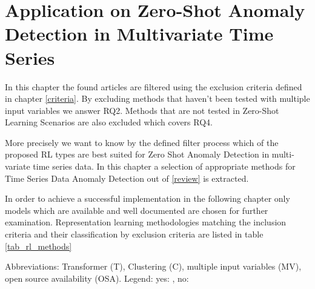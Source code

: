 \section{Application on Zero-Shot Anomaly Detection in Multivariate Time Series}\label{application}
In this chapter the found articles are filtered using the exclusion criteria defined in chapter \ref{criteria}. By excluding methods that haven't been tested with multiple input variables we answer RQ2. Methods that are not tested in Zero-Shot Learning Scenarios are also excluded which covers RQ4.

More precisely we want to know by the defined filter process which of the proposed RL types are best suited for Zero Shot Anomaly Detection in multi-variate time series data. In this chapter a selection of appropriate methods for Time Series Data Anomaly Detection out of \ref{review} is extracted.

 In order to achieve a successful implementation in the following chapter only models which are available and well documented are chosen for further examination. Representation learning methodologies matching the inclusion criteria and their classification by exclusion criteria are listed in table \ref{tab_rl_methods}
 \begin{table}
   \caption{Abbreviations: Transformer (T), Clustering (C), multiple input variables (MV), open source availability (OSA). Legend: yes: \cmark, no: \xmark}\label{tab_rl_methods}
   
 \end{table}
